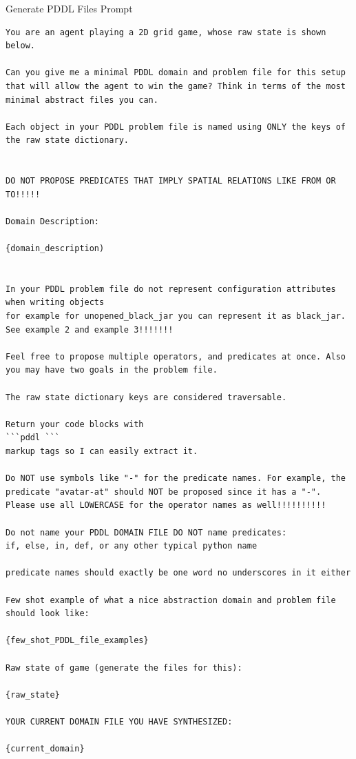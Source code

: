 \documentclass{article}
\theoremstyle{plain}
\theoremstyle{definition}
\theoremstyle{remark}
\begin{document}
\begin{mybox}[boxrule=0pt, parbox=false, opacityframe=1, colframe=black, label=box:generate_pddl_files_prompt]{Generate PDDL Files Prompt}
\begin{lstlisting}[basicstyle=\ttfamily\small, breaklines=true]
You are an agent playing a 2D grid game, whose raw state is shown below.

Can you give me a minimal PDDL domain and problem file for this setup that will allow the agent to win the game? Think in terms of the most minimal abstract files you can.

Each object in your PDDL problem file is named using ONLY the keys of the raw state dictionary.


DO NOT PROPOSE PREDICATES THAT IMPLY SPATIAL RELATIONS LIKE FROM OR TO!!!!!

Domain Description:

{domain_description)


In your PDDL problem file do not represent configuration attributes when writing objects 
for example for unopened_black_jar you can represent it as black_jar. See example 2 and example 3!!!!!!!

Feel free to propose multiple operators, and predicates at once. Also you may have two goals in the problem file.

The raw state dictionary keys are considered traversable.

Return your code blocks with
```pddl ```
markup tags so I can easily extract it.

Do NOT use symbols like "-" for the predicate names. For example, the predicate "avatar-at" should NOT be proposed since it has a "-".
Please use all LOWERCASE for the operator names as well!!!!!!!!!!

Do not name your PDDL DOMAIN FILE DO NOT name predicates:
if, else, in, def, or any other typical python name

predicate names should exactly be one word no underscores in it either

Few shot example of what a nice abstraction domain and problem file should look like:

{few_shot_PDDL_file_examples}

Raw state of game (generate the files for this):

{raw_state}

YOUR CURRENT DOMAIN FILE YOU HAVE SYNTHESIZED:

{current_domain}

\end{lstlisting}
\end{mybox}
\end{document}
